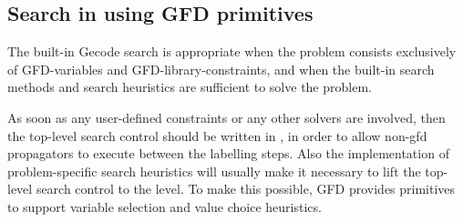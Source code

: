 \subsection{Search in {\eclipse} using GFD primitives\label{searchgfd}}

The built-in Gecode search is appropriate when the problem consists
exclusively of GFD-variables and GFD-library-constraints, and when the
built-in search methods and search heuristics are sufficient to solve
the problem.

As soon as any user-defined constraints or any other {\eclipse}
solvers are involved, then the top-level search control should be
written in \eclipse, in order to allow non-gfd propagators to execute
between the labelling steps.  Also the implementation of problem-specific
search heuristics will usually make it necessary to lift the top-level
search control to the {\eclipse} level.
To make this possible, GFD provides primitives to support variable 
selection and value choice heuristics.

